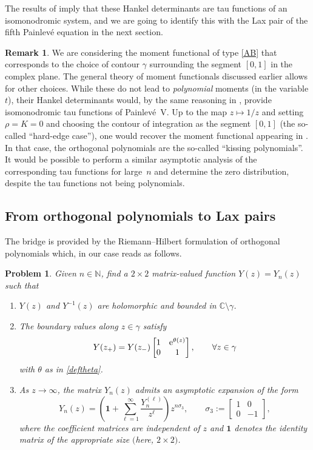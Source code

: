 \documentclass[10pt,a4paper]{amsart}
\numberwithin{equation}{section}
\newtheorem{problem}[Theorem]{Problem}
\theoremstyle{definition}
\newtheorem{Remark}[Theorem]{Remark}
\def\le{\left}
\def\ri{\right}
\def\be{\begin{equation}}
\def\ee{\end{equation}}
\def \1{\mathbf 1}
\def\C{{\mathbb C}}
\def\s{\sigma}
\begin{document}
The results of \cite{Bertola:Semiiso} imply that these Hankel determinants are tau functions of an isomonodromic system, and we are going to identify this with the Lax pair of the fifth Painlev\'e equation in the next section.

\begin{Remark}
We are considering the moment functional of type \eqref{AB} that corresponds to the choice of contour $\gamma$ surrounding the segment $[0,1]$ in the complex plane. The general theory of moment functionals discussed earlier allows for other choices. While these do not lead to {\it polynomial} moments (in the variable $t$), their Hankel determinants would, by the same reasoning in \cite{Bertola:Semiiso}, provide isomonodromic tau functions of Painlev\'e~V. Up to the map $z\mapsto 1/z$ and setting ${\rho}= {K} =0$ and choosing the contour of integration as the segment $[0,1]$ (the so-called ``hard-edge case''), one would recover the moment functional appearing in \cite{Deano}. In that case, the orthogonal polynomials are the so-called ``kissing polynomials''. It would be possible to perform a similar asymptotic analysis of the corresponding tau functions for large~$n$ and determine the zero distribution, despite the tau functions not being polynomials.
\end{Remark}
%
\subsection{From orthogonal polynomials to Lax pairs}
\label{SecOPLP}
The bridge is provided by the Riemann--Hilbert formulation of orthogonal polynomials \cite{FIK} which, in our case reads as follows.
\begin{problem}
\label{RHPY}
Given $n\in \mathbb N$,
find a $2\times 2$ matrix-valued function $Y(z)= Y_n(z)$ such that
\begin{enumerate}\itemsep=0pt
\item[$(1)$] $Y(z)$ and $Y^{-1}(z)$ are holomorphic and bounded in $\C\setminus \gamma$.
\item[$(2)$] The boundary values along $z\in \gamma$ satisfy
\[
Y(z_+) = Y(z_-) \begin{bmatrix}
1&{\rm e}^{\theta(z)}\\
0 & 1
\end{bmatrix},\qquad \forall z\in \gamma
\]
with $\theta$ as in \eqref{deftheta}.
\item[$(3)$] As $z\to \infty$, the matrix $Y_n(z)$ admits an asymptotic expansion of the form
\be
\label{asympY}
Y_n(z) = \le(\1 + \sum_{\ell=1}^\infty \frac {Y_n^{(\ell)}} {z^\ell} \ri)z^{n\s_3}, \qquad \s_3:= \begin{bmatrix} 1&0\\ 0&-1\end{bmatrix},
\ee
where the coefficient matrices  are independent of $z$ and $\1$ denotes the identity matrix of the appropriate size $($here, $2\times 2)$.
\end{enumerate}
\end{problem}
\end{document}
